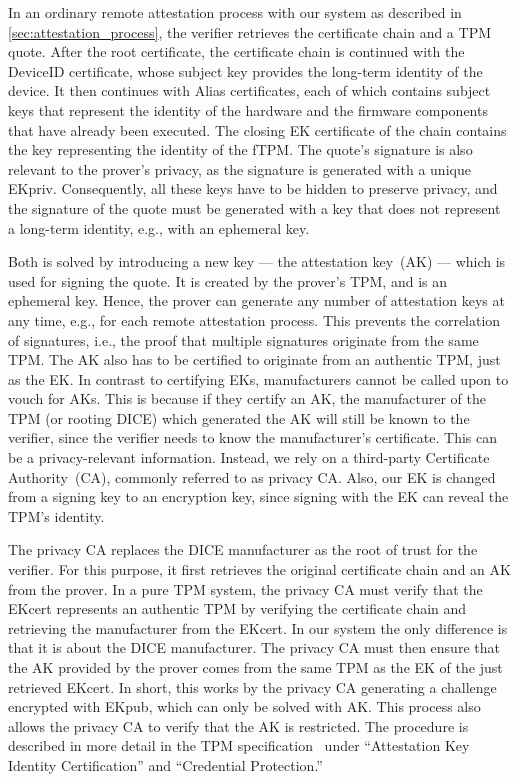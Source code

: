 In an ordinary remote attestation process with our system as described in \autoref{sec:attestation_process}, the verifier retrieves the certificate chain and a TPM quote.
After the root certificate, the certificate chain is continued with the DeviceID certificate, whose subject key provides the long-term identity of the device.
It then continues with Alias certificates, each of which contains subject keys that represent the identity of the hardware and the firmware components that have already been executed.
The closing EK certificate of the chain contains the key representing the identity of the fTPM\@.
The quote's signature is also relevant to the prover's privacy, as the signature is generated with a unique EKpriv.
Consequently, all these keys have to be hidden to preserve privacy, and the signature of the quote must be generated with a key that does not represent a long-term identity, e.g., with an ephemeral key.

Both is solved by introducing a new key --- the attestation key~(AK) --- which is used for signing the quote.
It is created by the prover's TPM, and is an ephemeral key.
Hence, the prover can generate any number of attestation keys at any time, e.g., for each remote attestation process.
This prevents the correlation of signatures, i.e., the proof that multiple signatures originate from the same TPM\@.
The AK also has to be certified to originate from an authentic TPM, just as the EK\@.
In contrast to certifying EKs, manufacturers cannot be called upon to vouch for AKs.
This is because if they certify an AK, the manufacturer of the TPM (or rooting DICE) which generated the AK will still be known to the verifier, since the verifier needs to know the manufacturer's certificate.
This can be a privacy-relevant information.
Instead, we rely on a third-party Certificate Authority~(CA), commonly referred to as privacy CA\@.
Also, our EK is changed from a signing key to an encryption key, since signing with the EK can reveal the TPM's identity.

The privacy CA replaces the DICE manufacturer as the root of trust for the verifier.
For this purpose, it first retrieves the original certificate chain and an AK from the prover.
In a pure TPM system, the privacy CA must verify that the EKcert represents an authentic TPM by verifying the certificate chain and retrieving the manufacturer from the EKcert.
In our system the only difference is that it is about the DICE manufacturer\@.
The privacy CA must then ensure that the AK provided by the prover comes from the same TPM as the EK of the just retrieved EKcert.
In short, this works by the privacy CA generating a challenge encrypted with EKpub, which can only be solved with AK\@.
This process also allows the privacy CA to verify that the AK is restricted.
The procedure is described in more detail in the TPM specification~\cite{tpm} under ``Attestation Key Identity Certification'' and ``Credential Protection.''

